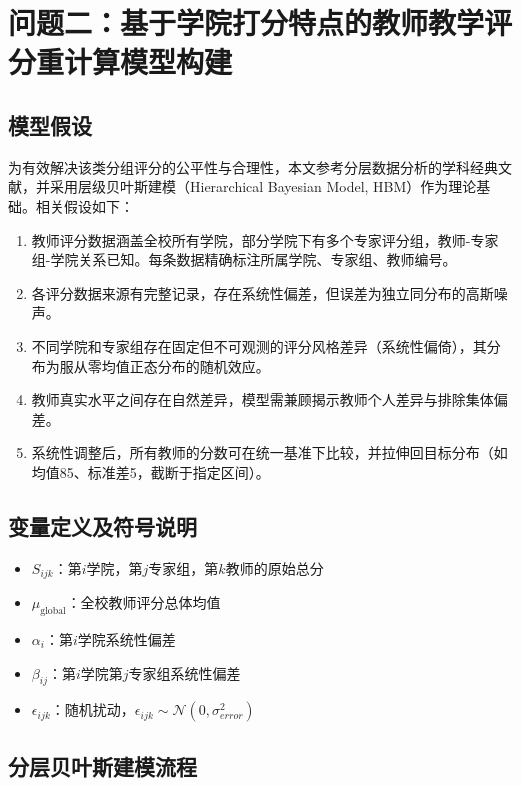\section{问题二：基于学院打分特点的教师教学评分重计算模型构建}






\subsection{模型假设}
为有效解决该类分组评分的公平性与合理性，本文参考分层数据分析的学科经典文献，并采用层级贝叶斯建模（Hierarchical Bayesian Model, HBM）作为理论基础。相关假设如下：

\begin{enumerate}
    \item 教师评分数据涵盖全校所有学院，部分学院下有多个专家评分组，教师-专家组-学院关系已知。每条数据精确标注所属学院、专家组、教师编号。
    \item 各评分数据来源有完整记录，存在系统性偏差，但误差为独立同分布的高斯噪声。
    \item 不同学院和专家组存在固定但不可观测的评分风格差异（系统性偏倚），其分布为服从零均值正态分布的随机效应。
    \item 教师真实水平之间存在自然差异，模型需兼顾揭示教师个人差异与排除集体偏差。
    \item 系统性调整后，所有教师的分数可在统一基准下比较，并拉伸回目标分布（如均值85、标准差5，截断于指定区间）。
\end{enumerate}


\subsection{变量定义及符号说明}
\begin{itemize}
    \item $S_{ijk}$：第$i$学院，第$j$专家组，第$k$教师的原始总分
    \item $\mu_\text{global}$：全校教师评分总体均值
    \item $\alpha_i$：第$i$学院系统性偏差
    \item $\beta_{ij}$：第$i$学院第$j$专家组系统性偏差
    \item $\epsilon_{ijk}$：随机扰动，$\epsilon_{ijk} \sim\mathcal{N}(0, \sigma_{error}^2)$
\end{itemize}

\subsection{分层贝叶斯建模流程}
